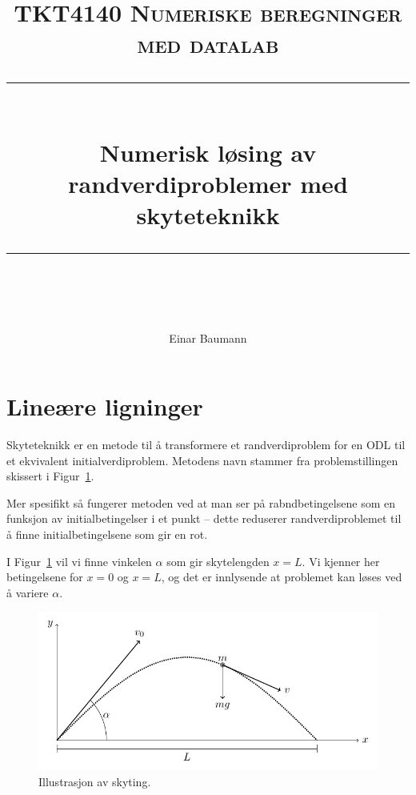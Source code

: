 



\usepackage{etex}
\usepackage{tikz,pgfplots}
\pgfplotsset{compat=1.9}
\usetikzlibrary{arrows,decorations.markings}


\author{Einar Baumann}
\title{
    \vspace{-1in}
    \normalfont \normalsize \textsc{TKT4140 Numeriske beregninger med datalab} \\ [20pt]
    \vspace{0.1in}
    \rule{\textwidth}{0.5pt} \\[1cm]
    {\sffamily \huge Numerisk løsing av randverdiproblemer med skyteteknikk} \\
    \vspace{0.1in}
    \rule{\textwidth}{2pt} \\[0.7cm]
}


\maketitle
\thispagestyle{empty}
\clearpage

\section{Lineære ligninger} %
\label{sec:line_re_ligninger}
Skyteteknikk er en metode til å transformere et randverdiproblem for en ODL til et ekvivalent initialverdiproblem\cite{komp}. Metodens navn stammer fra problemstillingen skissert i Figur~\ref{fig:skyting}.

Mer spesifikt så fungerer metoden ved at man ser på rabndbetingelsene som en funksjon av initialbetingelser i et punkt -- dette reduserer randverdiproblemet til å finne initialbetingelsene som gir en rot.

I Figur~\ref{fig:skyting} vil vi finne vinkelen $\alpha$ som gir skytelengden $x=L$. Vi kjenner her betingelsene for $x=0$ og $x=L$, og det er innlysende at problemet kan løses ved å variere $\alpha$.

\begin{figure}[htbp]
  \centering
  \includegraphics[]{illustrasjoner/shooting.pdf}
  \caption{Illustrasjon av skyting.}
  \label{fig:skyting}
\end{figure}



